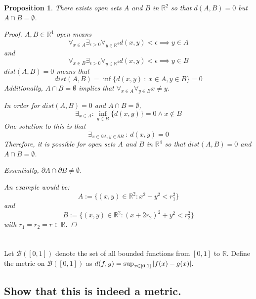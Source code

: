 \documentclass[]{article}
\newcommand{\R}{\mathbb{R}}
\newcommand{\st}{\ : \ }
\newtheorem{proposition}{Proposition}
\begin{document}
\begin{proposition}
    There exists open sets $A$ and $B$ in $\R^2$ so that $d(A,B) = 0$ but $A \cap B = \emptyset$.
    \begin{proof}
        $A,B \in \R^4$ open means 
        \[
            \forall_{x \in A} \exists_{\epsilon>0} \forall_{y \in \R^4} d(x,y) < \epsilon \implies y \in A
        \]
        and 
        \[
            \forall_{x \in B} \exists_{\epsilon>0} \forall_{y \in \R^4} d(x,y) < \epsilon \implies y \in B
        \]
        $dist(A,B) = 0$ means that 
        \[dist(A,B) = \inf\{d(x,y) \st x \in A, y \in B\} = 0\]
        Additionally, $A \cap B = \emptyset$ implies that $\forall_{x \in A} \forall_{y \in B} x \neq y$.

        In order for $dist(A,B) = 0$ and $A \cap B = \emptyset$, 
        \[\exists_{x \in A} : \inf_{y \in B} \{d(x,y)\} = 0 \land x \notin B\]
        One solution to this is that
        \[\exists_{x \in \partial{A}, y \in \partial{B}} \st d(x,y) = 0\]
        Therefore, it is possible for open sets $A$ and $B$ in $\R^4$ so that $dist(A,B) = 0$ and $A \cap B = \emptyset$.

        Essentially, $\partial{A} \cap \partial{B} \neq \emptyset$.

        An example would be: 
        \[A := \{(x,y) \in \R^2 : x^2 + y^2 < r_1^2\}\]
        and 
        \[B := \{(x,y) \in \R^2: (x + 2r_2)^2 + y^2 < r_2^2\}\]
        with $r_1 = r_2 = r \in \R$.
    \end{proof}
\end{proposition}

\newpage
\section{}
Let $\mathcal{B}([0,1])$ denote the set of all bounded functions from $[0,1]$ to $\R$. Define the metric on $\mathcal{B}([0,1])$ as $d(f,g) = \sup_{x \in [0,1]} \abs{f(x) - g(x)}$.

\subsection{Show that this is indeed a metric.}
\end{document}
